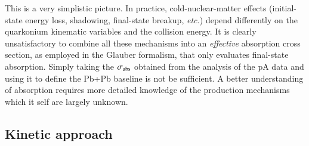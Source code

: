 This is a very simplistic picture. In practice, cold-nuclear-matter effects 
(initial-state energy loss, shadowing, final-state breakup, {\it etc.}) 
depend differently on the quarkonium kinematic variables and the collision energy. 
It is clearly unsatisfactory to combine all these mechanisms into an {\it effective} 
absorption cross section, as employed in the Glauber formalism, 
that only evaluates final-state absorption. 
Simply taking the $\sigma_{\rm abs}$ obtained from 
the analysis of the pA data 
and using it to define the Pb+Pb baseline is not be sufficient. 
A better understanding of absorption requires more detailed knowledge of the 
production mechanisms which it self are largely unknown.






\subsection{Kinetic approach}

